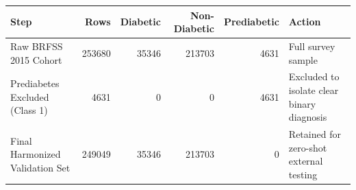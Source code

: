 \begin{tabular}{lrrrrl}
\toprule
Step & Rows & Diabetic & Non-Diabetic & Prediabetic & Action \\
\midrule
Raw BRFSS 2015 Cohort & 253680 & 35346 & 213703 & 4631 & Full survey sample \\
Prediabetes Excluded (Class 1) & 4631 & 0 & 0 & 4631 & Excluded to isolate clear binary diagnosis \\
Final Harmonized Validation Set & 249049 & 35346 & 213703 & 0 & Retained for zero-shot external testing \\
\bottomrule
\end{tabular}
